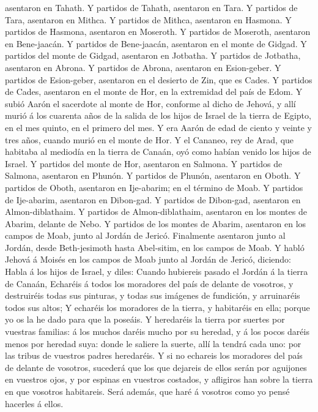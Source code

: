 asentaron en Tahath.  Y partidos de Tahath, asentaron en
Tara.  Y partidos de Tara, asentaron en Mithca.
 Y partidos de Mithca, asentaron en Hasmona. 
Y partidos de Hasmona, asentaron en Moseroth.  Y partidos
de Moseroth, asentaron en Bene-jaacán.  Y partidos de
Bene-jaacán, asentaron en el monte de Gidgad.  Y partidos
del monte de Gidgad, asentaron en Jotbatha.  Y partidos de
Jotbatha, asentaron en Abrona.  Y partidos de Abrona,
asentaron en Esion-geber.  Y partidos de Esion-geber,
asentaron en el desierto de Zin, que es Cades.  Y partidos
de Cades, asentaron en el monte de Hor, en la extremidad del país de
Edom.  Y subió Aarón el sacerdote al monte de Hor, conforme
al dicho de Jehová, y allí murió á los cuarenta años de la salida de los
hijos de Israel de la tierra de Egipto, en el mes quinto, en el primero
del mes.  Y era Aarón de edad de ciento y veinte y tres
años, cuando murió en el monte de Hor.  Y el Cananeo, rey
de Arad, que habitaba al mediodía en la tierra de Canaán, oyó como
habían venido los hijos de Israel.  Y partidos del monte de
Hor, asentaron en Salmona.  Y partidos de Salmona,
asentaron en Phunón.  Y partidos de Phunón, asentaron en
Oboth.  Y partidos de Oboth, asentaron en Ije-abarim; en el
término de Moab.  Y partidos de Ije-abarim, asentaron en
Dibon-gad.  Y partidos de Dibon-gad, asentaron en
Almon-diblathaim.  Y partidos de Almon-diblathaim,
asentaron en los montes de Abarim, delante de Nebo.  Y
partidos de los montes de Abarim, asentaron en los campos de Moab, junto
al Jordán de Jericó.  Finalmente asentaron junto al Jordán,
desde Beth-jesimoth hasta Abel-sitim, en los campos de Moab.
 Y habló Jehová á Moisés en los campos de Moab junto al
Jordán de Jericó, diciendo:  Habla á los hijos de Israel, y
diles: Cuando hubiereis pasado el Jordán á la tierra de Canaán,
 Echaréis á todos los moradores del país de delante de
vosotros, y destruiréis todas sus pinturas, y todas sus imágenes de
fundición, y arruinaréis todos sus altos;  Y echaréis los
moradores de la tierra, y habitaréis en ella; porque yo os la he dado
para que la poseáis.  Y heredaréis la tierra por suertes
por vuestras familias: á los muchos daréis mucho por su heredad, y á los
pocos daréis menos por heredad suya: donde le saliere la suerte, allí la
tendrá cada uno: por las tribus de vuestros padres heredaréis.
 Y si no echareis los moradores del país de delante de
vosotros, sucederá que los que dejareis de ellos serán por aguijones en
vuestros ojos, y por espinas en vuestros costados, y afligiros han sobre
la tierra en que vosotros habitareis.  Será además, que
haré á vosotros como yo pensé hacerles á ellos.

